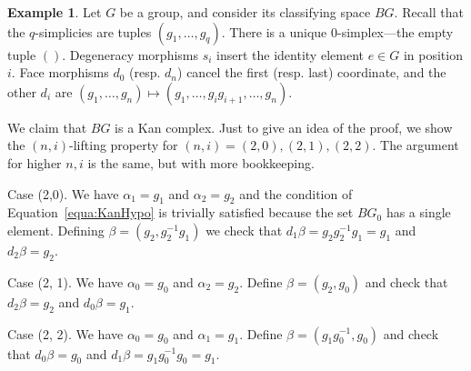 \documentclass[a4paper]{amsart}
\numberwithin{figure}{section}
\theoremstyle{theorem}
\theoremstyle{definition}
\newtheorem{exam}[thm]{Example}
\begin{document}

\begin{exam} \label{exam:classifyingSpace}
Let $G$ be a group, and consider its classifying space $BG$. Recall that the $q$-simplicies are tuples $(g_1, \dots, g_q)$. There is a unique $0$-simplex---the empty tuple $()$. Degeneracy morphisms $s_i$ insert the identity element $e \in G$ in position $i$. Face morphisms $d_0$ (resp. $d_n$) cancel the first (resp. last) coordinate, and the other $d_i$ are $(g_1, \dots, g_n) \mapsto (g_1, \dots, g_ig_{i+1}, \dots, g_n)$. 

We claim that $BG$ is a Kan complex. Just to give an idea of the proof, we show the $(n, i)$-lifting property for $(n, i) = (2, 0), (2, 1), (2, 2)$. The argument for higher $n, i$ is the same, but with more bookkeeping. 

Case (2,0). We have $\alpha_1 = g_1$ and $\alpha_2 = g_2$ and the condition of Equation~\ref{equa:KanHypo} is trivially satisfied because the set $BG_0$ has a single element. Defining $\beta = (g_2, g_2^{-1}g_1)$ we check that $d_1\beta = g_2g_2^{-1}g_1 = g_1$ and $d_2\beta = g_2$.

Case (2, 1). We have $\alpha_0 = g_0$ and $\alpha_2 = g_2$. Define $\beta = (g_2, g_0)$ and check that $d_2\beta = g_2$ and $d_0\beta = g_1$. 

Case (2, 2). We have $\alpha_0 = g_0$ and $\alpha_1 = g_1$. Define $\beta = (g_1g_0^{-1}, g_0)$ and check that $d_0\beta = g_0$ and $d_1\beta = g_1g_0^{-1}g_0 = g_1$. 
%
%
%
\end{exam}
\end{document}
